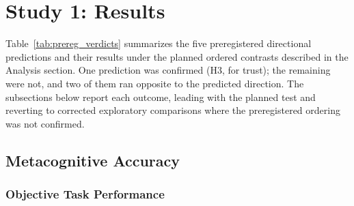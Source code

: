 \documentclass[manuscript,review,anonymous]{acmart}
\begin{document}
\section{Study 1: Results}

Table~\ref{tab:prereg_verdicts} summarizes the five preregistered directional predictions and their results under the planned ordered contrasts described in the Analysis section. One prediction was confirmed (H3, for trust); the remaining were not, and two of them ran opposite to the predicted direction. The subsections below report each outcome, leading with the planned test and reverting to corrected exploratory comparisons where the preregistered ordering was not confirmed.

\subsection{Metacognitive Accuracy}\label{sec:achieved_performance}



\subsubsection{Objective Task Performance} 
\end{document}
